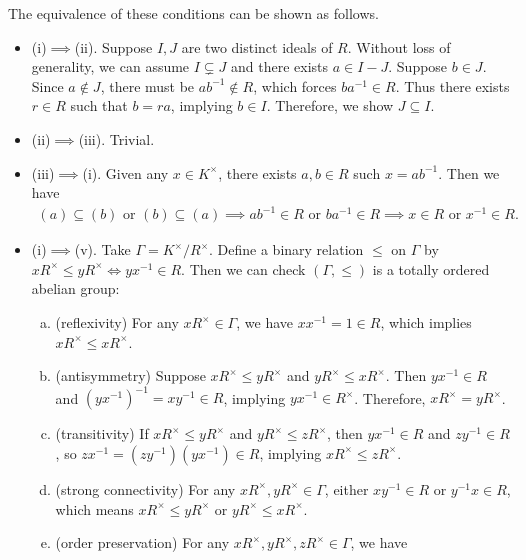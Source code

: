 \begin{prf}
    The equivalence of these conditions can be shown as follows.
    \begin{itemize}[leftmargin=*]
        \item (i)$\implies$(ii). Suppose $I,J$ are two distinct ideals of $R$. Without loss of generality, we can assume $I\subsetneq J$ and there exists $a\in I-J$. Suppose $b\in J$. Since $a\notin J$, there must be $ab^{-1}\notin R$, which forces $ba^{-1}\in R$. Thus there exists $r\in R$ such that $b=ra$, implying $b\in I$. Therefore, we show $J\subseteq I$.
        \item (ii)$\implies$(iii). Trivial.
        \item (iii)$\implies$(i). Given any $x\in K^{\times}$, there exists $a,b\in R$ such $x=ab^{-1}$. Then we have
    \begin{align*}
        (a)\subseteq (b)\text{ or }(b)\subseteq (a) \implies ab^{-1}\in R\text{ or } ba^{-1}\in R \implies x\in R \text{ or } x^{-1}\in R.
    \end{align*}
        \item (i)$\implies$(v). Take $\Gamma=K^\times / R^\times$. Define a binary relation $\le$ on $\Gamma$ by $xR^\times\le yR^\times\iff yx^{-1}\in R$. Then we can check $\left(\Gamma, \le\right)$ is a totally ordered abelian group:
    \begin{enumerate}[(a)]
        \item (reflexivity) For any $xR^\times\in \Gamma$, we have $xx^{-1}=1\in R$, which implies $xR^\times\le xR^\times$.
        \item (antisymmetry) Suppose $x R^{\times} \le y R^{\times}$ and $y R^{\times} \le x R^{\times}$. Then $y x^{-1} \in R$ and $\left(y x^{-1}\right)^{-1}=x y^{-1} \in R$, implying $y x^{-1}\in R^\times$. Therefore, $x R^{\times}=y R^{\times}$.
        \item (transitivity) If $x R^{\times} \leq y R^{\times}$ and $y R^{\times} \leq z R^{\times}$, then $y x^{-1} \in R$ and $z y^{-1} \in R$, so $z x^{-1}=\left(z y^{-1}\right)\left(y x^{-1}\right) \in R$, implying $x R^{\times} \leq z R^{\times}$.
        \item (strong connectivity) For any $xR^\times, yR^\times\in \Gamma$, either $xy^{-1}\in R$ or $y^{-1}x\in R$, which means $xR^\times\le yR^\times$ or $yR^\times\le xR^\times$.
        \item (order preservation) For any $xR^\times, yR^\times, zR^\times\in \Gamma$, we have
        \begin{align*}

\end{align*}
\end{enumerate}
\end{itemize}
\end{prf}
